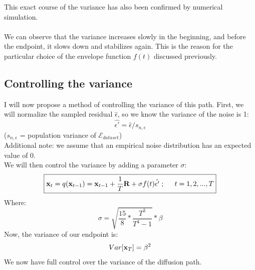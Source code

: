 \documentclass[twocolumn]{article}
\begin{document}
\begin{appendices}
\begin{center}
\end{center}

This exact course of the variance has also been confirmed by numerical simulation.\\
\\
We can observe that the variance increases slowly in the beginning, and before the endpoint, it slows down and stabilizes again. 
This is the reason for the particular choice of the envelope function $f(t)$ discussed previously.

\subsection{Controlling the variance}
I will now propose a method of controlling the variance of this path. 
First, we will normalize the sampled residual $\hat{\epsilon}$, so we know the variance of the noise is 1:
\begin{equation}
    \hat{\epsilon'} = \hat{\epsilon} / s_{n,\epsilon}
\end{equation}
($s_{n,\epsilon}$ = population variance of $\mathcal{E}_{dataset}$)\\
Additional note: we assume that an empirical noise distribution has an expected value of 0.\\
We will then control the variance by adding a parameter $\sigma$:
\begin{equation}
    \boxed{\bold{x}_t = q(\bold{x}_{t-1}) = \bold{x}_{t-1} + \frac{1}{T} \bold{R} + \sigma f(t) \hat{\epsilon'} \hspace{.1cm};\hspace{.5cm} t=1,2,...,T}
\end{equation}
Where: 
\begin{equation}
    \sigma = \sqrt{\frac{15}{8} * \frac{T^3}{T^4 - 1}} * \beta
\end{equation}
Now, the variance of our endpoint is: 
\begin{equation}
    Var[\bold{x}_T] = \beta^2
\end{equation}
We now have full control over the variance of the diffusion path.


\end{appendices}
\end{document}

